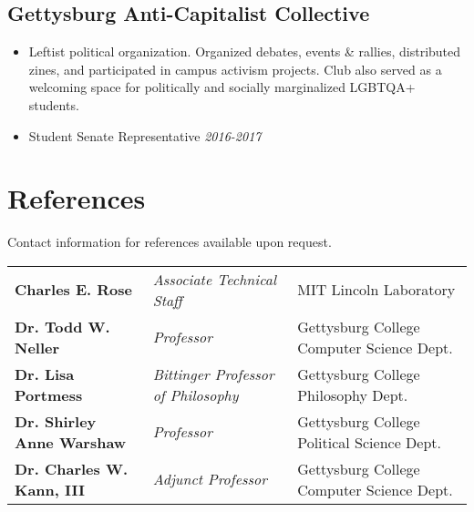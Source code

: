 \documentclass[11pt]{article}
\begin{document}
\subsection*{Gettysburg Anti-Capitalist Collective}
\begin{itemize}[noitemsep]
    \item Leftist political organization. Organized debates, events \& rallies, distributed zines, and participated in campus activism projects. Club also served as a welcoming space for politically and socially marginalized LGBTQA+ students. 
    \item Student Senate Representative \hfill \textit{2016-2017}
\end{itemize}


\section*{References}
Contact information for references available upon request. \\

\begin{tabular}{ l l l }
  	\textbf{Charles E. Rose} & \textit{Associate Technical Staff} & MIT Lincoln Laboratory \\
  	\textbf{Dr. Todd W. Neller} & \textit{Professor} & Gettysburg College Computer Science Dept. \\
  	  	\textbf{Dr. Lisa Portmess} & \textit{Bittinger Professor of Philosophy} & Gettysburg College Philosophy Dept. \\
  	\textbf{Dr. Shirley Anne Warshaw} & \textit{Professor} & Gettysburg College Political Science Dept. \\
  	\textbf{Dr. Charles W. Kann, III} & \textit{Adjunct Professor} & Gettysburg College Computer Science Dept. \\
\end{tabular}
\end{document}
